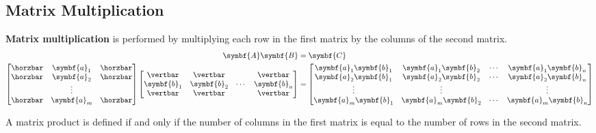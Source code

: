 \documentclass{article}
\begin{document}
\subsection{Matrix Multiplication}
\begin{definition}
    \textbf{Matrix multiplication} is performed by multiplying each row
    in the first matrix by the columns of the second matrix.
    \begin{align*}
        \symbf{A} \symbf{B} & = \symbf{C} \\
        \begin{bmatrix}
            \horzbar & \symbf{a}_{1} & \horzbar \\
            \horzbar & \symbf{a}_{2} & \horzbar \\
                     & \vdots        &          \\
            \horzbar & \symbf{a}_{m} & \horzbar
        \end{bmatrix}
        \begin{bmatrix}
            \vertbar      & \vertbar      &        & \vertbar      \\
            \symbf{b}_{1} & \symbf{b}_{2} & \cdots & \symbf{b}_{n} \\
            \vertbar      & \vertbar      &        & \vertbar
        \end{bmatrix}
                            & =
        \begin{bmatrix}
            \symbf{a}_1\symbf{b}_1 & \symbf{a}_1\symbf{b}_2 & \cdots & \symbf{a}_1\symbf{b}_n \\
            \symbf{a}_2\symbf{b}_1 & \symbf{a}_2\symbf{b}_2 & \cdots & \symbf{a}_2\symbf{b}_n \\
            \vdots                 & \vdots                 &        & \vdots                 \\
            \symbf{a}_m\symbf{b}_1 & \symbf{a}_m\symbf{b}_2 & \cdots & \symbf{a}_m\symbf{b}_n
        \end{bmatrix}
    \end{align*}
\end{definition}
\begin{theorem}
    A matrix product is defined if and only if the number of columns in
    the first matrix is equal to the number of rows in the second
    matrix.
\end{theorem}
\end{document}
